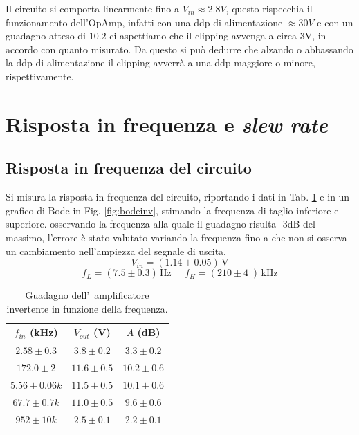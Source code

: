 \documentclass[10pt,a4paper]{article}
\begin{document}
Il circuito si comporta linearmente fino a $V_{in} \approx 2.8V$, questo rispecchia il funzionamento dell'OpAmp, infatti con una ddp di alimentazione $\approx 30V$ e con un guadagno atteso di $10.2$ ci aspettiamo che il clipping avvenga a circa 3V, in accordo con quanto misurato. Da questo si può dedurre che alzando o abbassando la ddp di alimentazione il clipping avverrà a una ddp maggiore o minore, rispettivamente.

%
\section{Risposta in frequenza e \emph{slew rate}}
\subsection{Risposta in frequenza del circuito}
Si misura la risposta in frequenza del circuito, riportando i dati  in Tab. \ref{tab:bodeinv} e
in un grafico di Bode in Fig. \ref{fig:bodeinv}, stimando la frequenza di taglio inferiore e 
superiore. osservando la frequenza alla quale il guadagno risulta -3dB del massimo, l'errore è stato valutato variando la frequenza fino a che non si osserva un cambiamento nell'ampiezza del segnale di uscita.
\[
V_{in} = (1.14 \pm 0.05 )\,\mathrm{V}
\]
\[
f_L = (7.5 \pm 0.3 )\,\mathrm{Hz}\;\;\;\;\;f_H = (210 \pm 4 \;)\,\mathrm{kHz}
\]
\begin{table}[h]
\caption{\small Guadagno dell'~amplificatore invertente in funzione della frequenza.}
\label{tab:bodeinv}
\begin{center}
\begin{tabular}{|c|c|c|}
\hline
$f_{in}$ (kHz) & $V_{out}$ (V) & $A$ (dB) \\
\hline
$2.58 \pm 0.3$& $ 3.8 \pm 0.2$& $3.3\pm 0.2$ \\ 
\hline
$172.0 \pm 2$& $ 11.6 \pm 0.5$& $10.2\pm 0.6$ \\
\hline
$5.56 \pm 0.06 k$& $ 11.5 \pm 0.5$& $10.1\pm 0.6$ \\ 
\hline
$67.7 \pm 0.7 k$& $ 11.0 \pm 0.5$& $9.6\pm 0.6$ \\ 
\hline
$952 \pm 10 k$& $ 2.5 \pm 0.1$& $2.2\pm 0.1$ \\ 
\hline
\end{tabular}
\end{center}
\end{table} 




 
\end{document}
